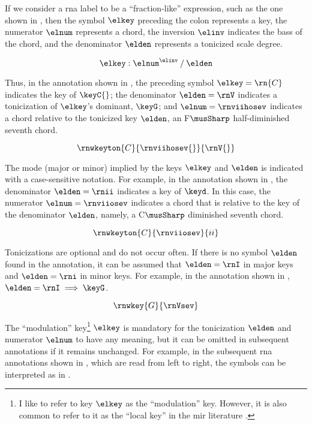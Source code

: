 
If we consider a \gls{rna} label to be a ``fraction-like''
expression, such as the one shown in ,
then the symbol $\elkey$ preceding the colon represents a
key, the numerator $\elnum$ represents a chord, the
inversion $\elinv$ indicates the bass of the chord, and the
denominator $\elden$ represents a tonicized scale degree.

\begin{equation}
    \label{eq:rn_expression}
    \elkey : \elnum^{\elinv} \: / \: \elden
\end{equation}

Thus, in the annotation shown in , the
preceding symbol $\elkey=\rn{C}$ indicates the key of
$\keyC{}$; the denominator $\elden = \rnV$ indicates a
tonicization of $\elkey$'s dominant, $\keyG$; and
$\elnum=\rnviihosev$ indicates a chord relative to the
tonicized key $\elden$, an F$\musSharp$ half-diminished
seventh chord.

\begin{equation}
    \label{eq:rn_example1}
    \rnwkeyton{C}{\rnviihosev{}}{\rnV{}}
\end{equation}


The mode (major or minor) implied by the keys $\elkey$ and
$\elden$ is indicated with a case-sensitive notation. For
example, in the annotation shown in , the
denominator $\elden=\rnii$ indicates a key of $\keyd$. In
this case, the numerator $\elnum = \rnviiosev$ indicates a
chord that is relative to the key of the denominator
$\elden$, namely, a C$\musSharp$ diminished seventh chord.

\begin{equation}
    \label{eq:rn_example2}
    \rnwkeyton{C}{\rnviiosev}{ii}
\end{equation}

Tonicizations are optional and do not occur often. If there
is no symbol $\elden$ found in the annotation, it can be
assumed that $\elden = \rnI$ in major keys and $\elden =
\rni$ in minor keys. For example, in the annotation shown in
, $\elden = \rnI \implies \keyG$.

\begin{equation}
    \label{eq:rn_example3}
    \rnwkey{G}{\rnVsev}
\end{equation}

The ``modulation'' key\footnote{I like to refer to key
$\elkey$ as the ``modulation'' key. However, it is also
common to refer to it as the ``local key'' in the \gls{mir}
literature \parencite{napoleslopez2020local}.} $\elkey$ is
mandatory for the tonicization $\elden$ and numerator
$\elnum$ to have any meaning, but it can be omitted in
subsequent annotations if it remains unchanged. For example,
in the subsequent \gls{rna} annotations shown in
, which are read from left to
right, the symbols can be interpreted as in
.

